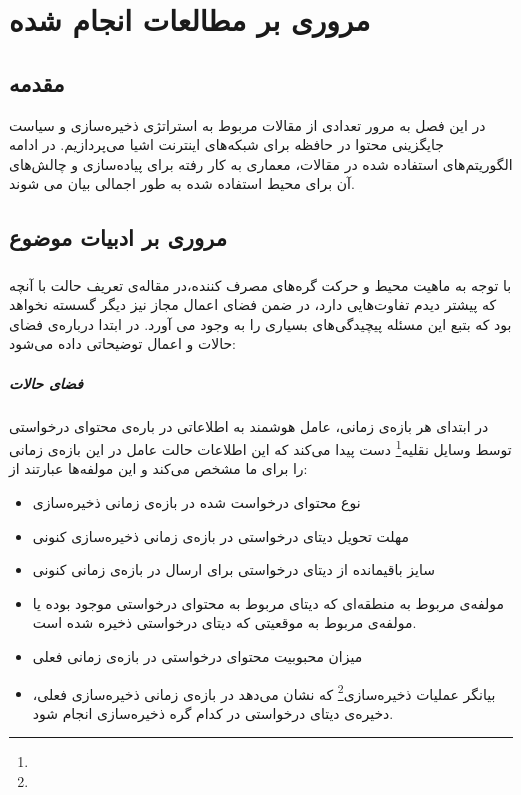 \chapter{مروری بر مطالعات انجام شده}
\section{مقدمه}
در این فصل به مرور تعدادی از مقالات مربوط به استراتژی ذخیره‌سازی و سیاست جایگزینی محتوا در حافظه برای شبکه‌های اینترنت اشیا می‌پردازیم. در ادامه الگوریتم‌های استفاده شده در مقالات، معماری به کار رفته برای پیاده‌سازی و چالش‌های آن برای محیط  استفاده شده به طور اجمالی بیان می شوند. 

\section{مروری بر ادبیات موضوع}

\subsection{}
با توجه به ماهیت محیط و حرکت گره‌های مصرف کننده،‌در مقاله‌ی \cite{qiao2019deep} تعریف حالت با آنچه که پیشتر دیدم تفاوت‌هایی دارد، در ضمن فضای اعمال مجاز نیز دیگر گسسته نخواهد بود که بتبع این مسئله پیچیدگی‌های بسیاری را به وجود می آورد. در ابتدا درباره‌ی فضای حالات و اعمال توضیحاتی داده می‌شود:

\paragraph{فضای حالات}
در ابتدای هر بازه‌ی زمانی، عامل هوشمند به اطلاعاتی در باره‌ی محتوای درخواستی توسط وسایل نقلیه\footnote{} دست پیدا می‌کند که این اطلاعات حالت عامل در این بازه‌ی زمانی را برای ما مشخص می‌کند و این مولفه‌ها عبارتند از:  
\begin{itemize}
	\item 
	نوع محتوای درخواست شده در بازه‌ی زمانی ذخیره‌سازی 
	\item 
	مهلت تحویل دیتای درخواستی در بازه‌ی زمانی ذخیره‌سازی کنونی
	\item
	سایز باقیمانده از دیتای درخواستی برای ارسال در بازه‌ی زمانی کنونی
	\item
	مولفه‌ی مربوط به منطقه‌ای که دیتای مربوط به محتوای درخواستی موجود بوده یا مولفه‌ی مربوط به موقعیتی که دیتای درخواستی ذخیره شده است.
	\item 
	میزان محبوبیت محتوای درخواستی در بازه‌ی زمانی فعلی
	\item 
	بیانگر عملیات ذخیره‌سازی\footnote{} که نشان می‌دهد در بازه‌ی زمانی ذخیره‌سازی فعلی، دخیره‌ی دیتای درخواستی در کدام گره ذخیره‌سازی انجام شود.
\end{itemize}

